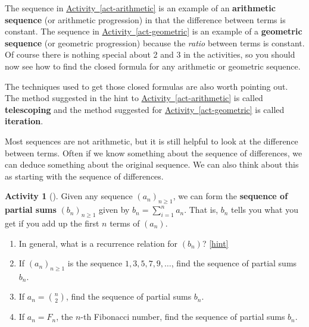 \documentclass[10pt,]{book}
\newcommand{\terminology}[1]{\textbf{#1}}
\theoremstyle{plain}
\theoremstyle{definition}
\theoremstyle{definition}
\theoremstyle{definition}
\newtheorem{activity}[project]{Activity}
\numberwithin{equation}{chapter}
\begin{document}
\hypertarget{p-926}{}%
The sequence in \hyperref[act-arithmetic]{Activity~\ref{act-arithmetic}} is an example of an \terminology{arithmetic sequence} (or arithmetic progression) in that the difference between terms is constant.  The sequence in \hyperref[act-geometric]{Activity~\ref{act-geometric}} is an example of a \terminology{geometric sequence} (or geometric progression) because the \emph{ratio} between terms is constant.  Of course there is nothing special about 2 and 3 in the activities, so you should now see how to find the closed formula for any arithmetic or geometric sequence.%
\par
\hypertarget{p-927}{}%
The techniques used to get those closed formulas are also worth pointing out.  The method suggested in the hint to \hyperref[act-arithmetic]{Activity~\ref{act-arithmetic}} is called \terminology{telescoping} and the method suggested for \hyperref[act-geometric]{Activity~\ref{act-geometric}} is called \terminology{iteration}.%
\par
\hypertarget{p-928}{}%
Most sequences are not arithmetic, but it is still helpful to look at the difference between terms.  Often if we know something about the sequence of differences, we can deduce something about the original sequence.   We can also think about this as starting with the sequence of differences.%
\begin{activity}[]\label{activity-138}
\hypertarget{p-929}{}%
Given any sequence \((a_n)_{n \ge 1}\), we can form the \terminology{sequence of partial sums} \((b_n)_{n \ge 1}\) given by \(b_n = \sum_{i = 1}^n a_n\).  That is, \(b_n\) tells you what you get if you add up the first \(n\) terms of \((a_n)\).%
\begin{enumerate}[font=\bfseries,label=(\alph*),ref=\alph*]
\item\label{task-173} \hypertarget{p-930}{}%
In general, what is a recurrence relation for \((b_n)\)?%
\hfill{\tiny\hyperlink{a-145.a}{[hint]}\hypertarget{q-145.a}{}}\item\label{task-174} \hypertarget{p-932}{}%
If \((a_n)_{n \ge 1}\) is the sequence \(1, 3, 5, 7, 9, \ldots\), find the sequence of partial sums \(b_n\).%
\item\label{task-175} \hypertarget{p-933}{}%
If \(a_n = \binom{n}{2}\), find the sequence of partial sums \(b_n\).%
\item\label{task-176} \hypertarget{p-934}{}%
If \(a_n = F_n\), the \(n\)-th Fibonacci number, find the sequence of partial sums \(b_n\).%
\end{enumerate}
\end{activity}
\end{document}
